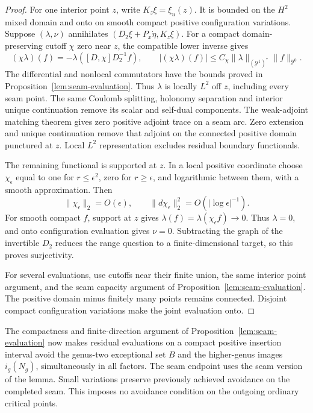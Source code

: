 \documentclass[11pt]{amsart}
\theoremstyle{definition}
\theoremstyle{remark}
\theoremstyle{plain}
\begin{document}
\begin{proof}
For one interior point $z$, write $K_z\xi=\xi_u(z)$.
It is bounded on the $H^2$ mixed domain and onto on
smooth compact positive configuration variations.
Suppose $(\lambda,\nu)$ annihilates
$(D_2\xi+P_x\dot\eta,K_z\xi)$.
For a compact domain-preserving cutoff $\chi$ zero near $z$,
the compatible lower inverse gives
\[
 (\chi\lambda)(f)
 =-\lambda([D,\chi]D_2^{-1}f),\qquad
 |(\chi\lambda)(f)|
 \le C_\chi\|\lambda\|_{(\mathcal Y^1)^*}
                       \|f\|_{\mathcal Y^0}.
\]
The differential and nonlocal commutators have the bounds
proved in Proposition~\ref{lem:seam-evaluation}.
Thus $\lambda$ is locally $L^2$ off $z$, including every
seam point.
The same Coulomb splitting, holonomy separation and interior
unique continuation remove its scalar and self-dual
components. The weak-adjoint matching theorem gives zero
positive adjoint trace on a seam arc. Zero extension and
unique continuation remove that adjoint on the connected
positive domain punctured at $z$. Local $L^2$ representation
excludes residual boundary functionals.

The remaining functional is supported at $z$. In a local
positive coordinate choose $\chi_\epsilon$ equal to one for
$r\le\epsilon^2$, zero for $r\ge\epsilon$, and logarithmic
between them, with a smooth approximation. Then
\[
 \|\chi_\epsilon\|_2=O(\epsilon),\qquad
 \|d\chi_\epsilon\|_2^2=O(|\log\epsilon|^{-1}).
\]
For smooth compact $f$, support at $z$ gives
$\lambda(f)=\lambda(\chi_\epsilon f)\to0$.
Thus $\lambda=0$, and onto configuration evaluation gives
$\nu=0$. Subtracting the graph of the invertible $D_2$
reduces the range question to a finite-dimensional target,
so this proves surjectivity.

For several evaluations, use cutoffs near their finite
union, the same interior point argument, and the seam
capacity argument of
Proposition~\ref{lem:seam-evaluation}.
The positive domain minus finitely many points remains
connected. Disjoint compact configuration variations make
the joint evaluation onto.
\end{proof}

The compactness and finite-direction argument of
Proposition~\ref{lem:seam-evaluation} now makes residual
evaluations on a compact positive insertion interval avoid
the genus-two exceptional set $B$ and the higher-genus
images $i_g(N_g)$, simultaneously in all factors.
The seam endpoint uses the seam version of the lemma.
Small variations preserve previously achieved avoidance
on the completed seam. This imposes no avoidance condition
on the outgoing ordinary critical points.
\end{document}
